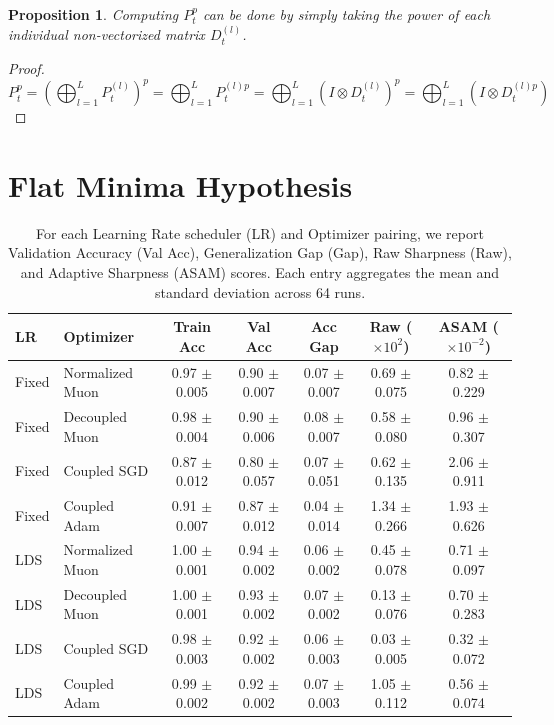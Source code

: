 \documentclass{article}
\theoremstyle{plain}
\newtheorem{proposition}[theorem]{Proposition}
\theoremstyle{definition}
\theoremstyle{remark}
\begin{document}
\begin{proposition}
Computing $P_{t}^p$ can be done by simply taking the power of each individual non-vectorized matrix $D_{t}^{(l)}$.
\end{proposition}

\begin{proof}
\begin{equation}
P_{t}^p = \left(\bigoplus_{l=1}^L P_{t}^{(l)}\right)^p = \bigoplus_{l=1}^L P_{t}^{(l)p} = \bigoplus_{l=1}^L (I \otimes D_{t}^{(l)})^p = \bigoplus_{l=1}^L (I \otimes D_{t}^{(l)p})
\end{equation}
\end{proof}

\section{Flat Minima Hypothesis}

\begin{table}[b]
\caption{For each Learning Rate scheduler (LR) and Optimizer pairing, we report Validation Accuracy (Val Acc), Generalization Gap (Gap), Raw Sharpness (Raw), and Adaptive Sharpness (ASAM) scores. Each entry aggregates the mean and standard deviation across 64 runs.}
\label{tbl:benchmark}
\vskip 0.15in
\begin{center}
\begin{small}
\begin{sc}
\begin{tabular}{llccccc}
\toprule
LR & Optimizer & Train Acc & Val Acc & Acc Gap & Raw ($\times 10^{2}$) & ASAM ($\times 10^{-2}$) \\
\midrule
Fixed & Normalized Muon & 0.97 $\pm$ 0.005 & 0.90 $\pm$ 0.007 & 0.07 $\pm$ 0.007 & 0.69 $\pm$ 0.075 & 0.82 $\pm$ 0.229 \\
Fixed & Decoupled Muon & 0.98 $\pm$ 0.004 & 0.90 $\pm$ 0.006 & 0.08 $\pm$ 0.007 & 0.58 $\pm$ 0.080 & 0.96 $\pm$ 0.307 \\
Fixed & Coupled SGD & 0.87 $\pm$ 0.012 & 0.80 $\pm$ 0.057 & 0.07 $\pm$ 0.051 & 0.62 $\pm$ 0.135 & 2.06 $\pm$ 0.911 \\
Fixed & Coupled Adam & 0.91 $\pm$ 0.007 & 0.87 $\pm$ 0.012 & 0.04 $\pm$ 0.014 & 1.34 $\pm$ 0.266 & 1.93 $\pm$ 0.626 \\
\midrule
LDS & Normalized Muon & 1.00 $\pm$ 0.001 & 0.94 $\pm$ 0.002 & 0.06 $\pm$ 0.002 & 0.45 $\pm$ 0.078 & 0.71 $\pm$ 0.097 \\
LDS & Decoupled Muon & 1.00 $\pm$ 0.001 & 0.93 $\pm$ 0.002 & 0.07 $\pm$ 0.002 & 0.13 $\pm$ 0.076 & 0.70 $\pm$ 0.283 \\
LDS & Coupled SGD & 0.98 $\pm$ 0.003 & 0.92 $\pm$ 0.002 & 0.06 $\pm$ 0.003 & 0.03 $\pm$ 0.005 & 0.32 $\pm$ 0.072 \\
LDS & Coupled Adam & 0.99 $\pm$ 0.002 & 0.92 $\pm$ 0.002 & 0.07 $\pm$ 0.003 & 1.05 $\pm$ 0.112 & 0.56 $\pm$ 0.074 \\
\bottomrule
\end{tabular}
\end{sc}
\end{small}
\end{center}
\vskip -0.1in
\end{table}
\end{document}
